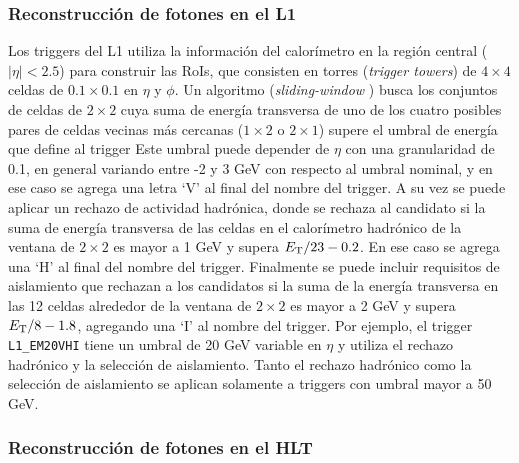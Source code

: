 \subsubsection{Reconstrucción de fotones en el L1}

Los triggers del L1 
utiliza la información del calorímetro en la región central ($|\eta|<2.5$) para construir las RoIs, que consisten en torres (\textit{trigger towers}) de $4\times4$ celdas de $0.1\times0.1$ en $\eta$ y $\phi$. Un algoritmo (\textit{sliding-window} \cite{Lampl:1099735}) busca los conjuntos de celdas de $2\times2$ cuya suma de energía transversa de uno de los cuatro posibles pares de celdas vecinas más cercanas ($1\times2$ o $2\times1$) supere el umbral de energía que define al trigger 
Este umbral puede depender de $\eta$ con una granularidad de 0.1, en general variando entre -2 y 3 GeV con respecto al umbral nominal, y en ese caso se agrega una letra `V' al final del nombre del trigger. A su vez se puede aplicar un rechazo de actividad hadrónica, donde se rechaza al candidato si la suma de energía transversa de las celdas en el calorímetro hadrónico de la ventana de $2\times2$ es mayor a 1 GeV y supera $E_{\text{T}}/23-0.2$. En ese caso se agrega una `H' al final del nombre del trigger. Finalmente se puede incluir requisitos de aislamiento que rechazan a los candidatos si la suma de la energía transversa en las 12 celdas alrededor de la ventana de $2\times2$ es mayor a 2 GeV y supera $E_{\text{T}}/8-1.8$, agregando una `I' al nombre del trigger. Por ejemplo, el trigger \texttt{L1\_EM20VHI} tiene un umbral de 20 GeV variable en $\eta$ y utiliza el rechazo hadrónico y la selección de aislamiento. Tanto el rechazo hadrónico como la selección de aislamiento se aplican solamente a triggers con umbral mayor a 50 GeV.

\subsubsection{Reconstrucción de fotones en el HLT}

